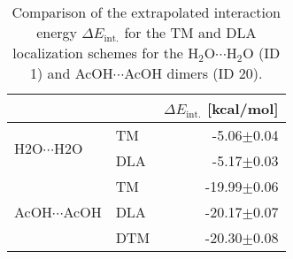 \begin{table}
\caption{\label{tab:loc_scheme_test}Comparison of the extrapolated interaction energy $\Delta E_\text{int.}$ for the TM and DLA localization schemes for the H$_2$O$\cdots$H$_2$O (ID 1) and AcOH$\cdots$AcOH dimers (ID 20).}
\begin{adjustbox}{center}
\begin{tabular}{llr}
\toprule
 &  & $\Delta E_\text{int.}$ [kcal/mol] \\ 
\midrule
\multirow[t]{2}{*}{H2O$\cdots$H2O} & TM & -5.06$\pm$0.04 \\
 & DLA & -5.17$\pm$0.03 \\
\cline{1-3}
\multirow[t]{3}{*}{AcOH$\cdots$AcOH} & TM & -19.99$\pm$0.06 \\
 & DLA & -20.17$\pm$0.07 \\
 & DTM & -20.30$\pm$0.08 \\
\cline{1-3}
\bottomrule
\end{tabular}
\end{adjustbox}
\end{table}